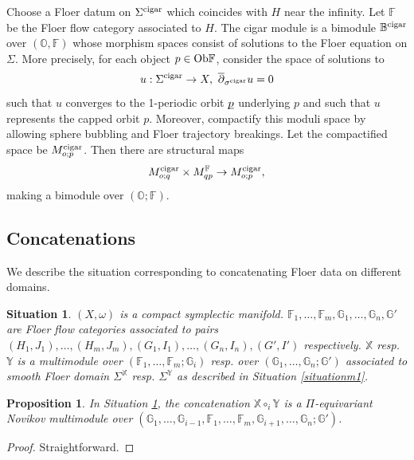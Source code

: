 \documentclass[reqno, 10pt]{amsart}
\numberwithin{equation}{section}
\numberwithin{equation}{section}
\newtheorem{situationc}{Situation}
\newtheorem{prop}[thm]{Proposition}
\theoremstyle{definition}
\theoremstyle{remark}
\newcommand{\beqn}{\begin{equation*}}
\newcommand{\eeqn}{\end{equation*}}
\newcommand{\ov}{\overline}
\newcommand{\mb}{\mathbb}
\newcommand{\uds}[1]{\underline{\smash{#1}}}
\begin{document}
Choose a Floer datum on $\Sigma^{\rm cigar}$ which coincides with $H$ near the infinity. Let ${\mb F}$ be the Floer flow category associated to $H$. The cigar module is a bimodule ${\mb B}^{\rm cigar}$ over $({\mb O}, {\mb F})$ whose morphism spaces consist of solutions to the Floer equation on $\Sigma$. More precisely, for each object $p \in {\rm Ob}{\mb F}$, consider the space of solutions to 
\beqn
u: \Sigma^{\rm cigar} \to X,\ \ov\partial_{\sigma^{\rm cigar}} u = 0 
\eeqn
such that $u$ converges to the 1-periodic orbit $\uds p$ underlying $p$ and such that $u$ represents the capped orbit $p$. Moreover, compactify this moduli space by allowing sphere bubbling and Floer trajectory breakings. Let the compactified space be $M_{o;p}^{\rm cigar}$. Then there are structural maps
\beqn
M_{o;q}^{\rm cigar} \times M_{qp}^{\mb F} \to M_{o;p}^{\rm cigar},\eeqn
making a bimodule over $({\mb O}; {\mb F})$. 

\subsection{Concatenations}\label{multimodule_concatenation}

We describe the situation corresponding to concatenating Floer data on different domains.

\begin{situationc}\label{situationc1}
$(X, \omega)$ is a compact symplectic manifold. ${\mb F}_1, \ldots, {\mb F}_m, {\mb G}_1, \ldots, {\mb G}_n, {\mb G}'$ are Floer flow categories associated to pairs $(H_1, J_1), \ldots, (H_m, J_m), (G_1, I_1), \ldots, (G_n, I_n), (G', I')$ respectively. ${\mb X}$ resp. ${\mb Y}$ is a multimodule over $({\mb F}_1, \ldots, {\mb F}_m; {\mb G}_i)$ resp. over $({\mb G}_1, \ldots, {\mb G}_n; {\mb G}')$ associated to smooth Floer domain $\Sigma^{\mb X}$ resp. $\Sigma^{\mb Y}$ as described in Situation \ref{situationm1}. 
\end{situationc}


\begin{prop}
In Situation \ref{situationc1}, the concatenation ${\mb X} \circ_i {\mb Y}$ is a $\Pi$-equivariant Novikov multimodule over $({\mb G}_1, \ldots, {\mb G}_{i-1}, {\mb F}_1, \ldots, {\mb F}_m, {\mb G}_{i+1}, \ldots, {\mb G}_n; {\mb G}')$. 
\end{prop}

\begin{proof}
Straightforward.
\end{proof}
\end{document}
